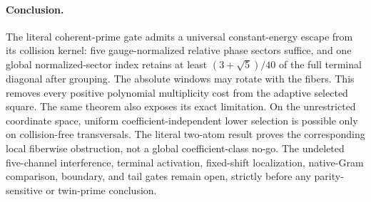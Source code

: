 \paragraph{Conclusion.}
The literal coherent-prime gate admits a universal constant-energy escape
from its collision kernel: five gauge-normalized relative phase sectors
suffice, and one global normalized-sector index retains at least
\((3+\sqrt5)/40\) of the full terminal diagonal after grouping.  The
absolute windows may rotate with the fibers.  This removes every positive polynomial
multiplicity cost from the adaptive selected square.  The same theorem
also exposes its exact limitation.  On the unrestricted coordinate space,
uniform coefficient-independent lower selection is possible only on
collision-free transversals.  The literal two-atom result proves the
corresponding local fiberwise obstruction, not a global coefficient-class
no-go.  The undeleted five-channel interference, terminal
activation, fixed-shift localization, native-Gram comparison, boundary,
and tail gates remain open, strictly before any parity-sensitive or
twin-prime conclusion.

